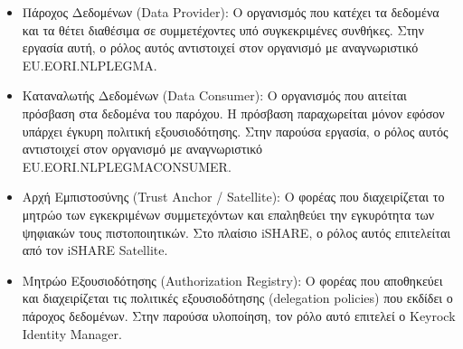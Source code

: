 \begin{itemize}
    \item Πάροχος Δεδομένων (\textlatin{Data Provider}): Ο οργανισμός που
    κατέχει τα δεδομένα και τα θέτει διαθέσιμα σε συμμετέχοντες υπό συγκεκριμένες
    συνθήκες. Στην εργασία αυτή, ο ρόλος αυτός αντιστοιχεί στον
    οργανισμό με αναγνωριστικό \textlatin{EU.EORI.NLPLEGMA}.

    \item Καταναλωτής Δεδομένων (\textlatin{Data Consumer}): Ο οργανισμός που
    αιτείται πρόσβαση στα δεδομένα του παρόχου. Η πρόσβαση παραχωρείται μόνον εφόσον
    υπάρχει έγκυρη πολιτική εξουσιοδότησης. Στην παρούσα εργασία, ο ρόλος αυτός
    αντιστοιχεί στον οργανισμό με αναγνωριστικό 
    \textlatin{EU.EORI.NLPLEGMACONSUMER}.

    \item Αρχή Εμπιστοσύνης (\textlatin{Trust Anchor} / \textlatin{Satellite}):
    Ο φορέας που διαχειρίζεται το μητρώο των εγκεκριμένων συμμετεχόντων και
    επαληθεύει την εγκυρότητα των ψηφιακών τους πιστοποιητικών. Στο πλαίσιο
    \textlatin{iSHARE}, ο ρόλος αυτός επιτελείται από τον \textlatin{iSHARE Satellite}.

    \item Μητρώο Εξουσιοδότησης (\textlatin{Authorization Registry}): Ο φορέας
    που αποθηκεύει και διαχειρίζεται τις πολιτικές εξουσιοδότησης
    (\textlatin{delegation policies}) που εκδίδει ο πάροχος δεδομένων. Στην παρούσα
    υλοποίηση, τον ρόλο αυτό επιτελεί ο \textlatin{Keyrock Identity Manager}.
\end{itemize}

